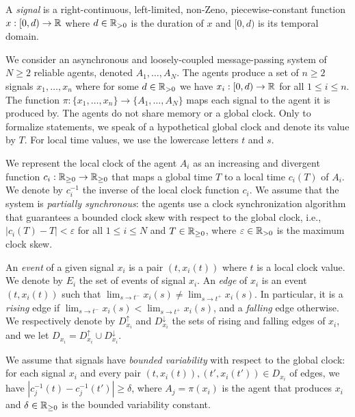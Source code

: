 \begin{definition}
	A \emph{signal} is a right-continuous, left-limited, non-Zeno, piecewise-constant function $x : [0,d) \to \mathbb{R}$ where $d \in \mathbb{R}_{> 0}$ is the duration of $x$ and $[0,d)$ is its temporal domain.
\end{definition}

We consider an asynchronous and loosely-coupled message-passing system of $N \geq 2$ reliable agents, denoted $A_1, \ldots, A_N$.
The agents produce a set of $n \geq 2$ signals $x_1, \ldots, x_n$ where for some $d \in \mathbb{R}_{> 0}$ we have $x_i : [0,d) \to \mathbb{R}$ for all $1 \leq i \leq n$.
The function $\pi : \{x_1, \ldots, x_n\} \to \{A_1, \ldots, A_N\}$ maps each signal to the agent it is produced by.
The agents do not share memory or a global clock.
Only to formalize statements, we speak of a hypothetical global clock and denote its value by $T$.
For local time values, we use the lowercase letters $t$ and $s$.

We represent the local clock of the agent $A_i$ as an increasing and divergent function $c_i : \mathbb{R}_{\geq 0} \to \mathbb{R}_{\geq 0}$ that maps a global time $T$ to a local time $c_i(T)$ of $A_i$.
We denote by $c_i^{-1}$ the inverse of the local clock function $c_i$.
We assume that the system is \emph{partially synchronous}: the agents use a clock synchronization algorithm that guarantees a bounded clock skew with respect to the global clock, i.e., $|c_i(T) - T| < \varepsilon$ for all $1 \leq i \leq N$ and $T \in \mathbb{R}_{\geq 0}$, where $\varepsilon \in \mathbb{R}_{> 0}$ is the maximum clock skew.

An \emph{event} of a given signal $x_i$ is a pair $(t, x_i(t))$ where $t$ is a local clock value.
We denote by $E_i$ the set of events of signal $x_i$.
An \emph{edge} of $x_i$ is an event $(t, x_i(t))$ such that $\lim_{s \to t^-} x_i(s) \neq \lim_{s \to t^+} x_i(s)$.
In particular, it is a \emph{rising} edge if $\lim_{s \to t^-} x_i(s) < \lim_{s \to t^+} x_i(s)$, and a \emph{falling} edge otherwise.
We respectively denote by $D_{x_i}^\uparrow$ and $D_{x_i}^\downarrow$ the sets of rising and falling edges of $x_i$, and we let $D_{x_i} = D_{x_i}^\uparrow \cup D_{x_i}^\downarrow$.

We assume that signals have \emph{bounded variability} with respect to the global clock: for each signal $x_i$ and every pair $(t, x_i(t)), (t', x_i(t')) \in D_{x_i}$ of edges, we have $|c_j^{-1}(t) - c_j^{-1}(t')| \geq \delta$, where $A_j = \pi(x_i)$ is the agent that produces $x_i$ and $\delta \in \mathbb{R}_{\geq 0}$ is the bounded variability constant.

